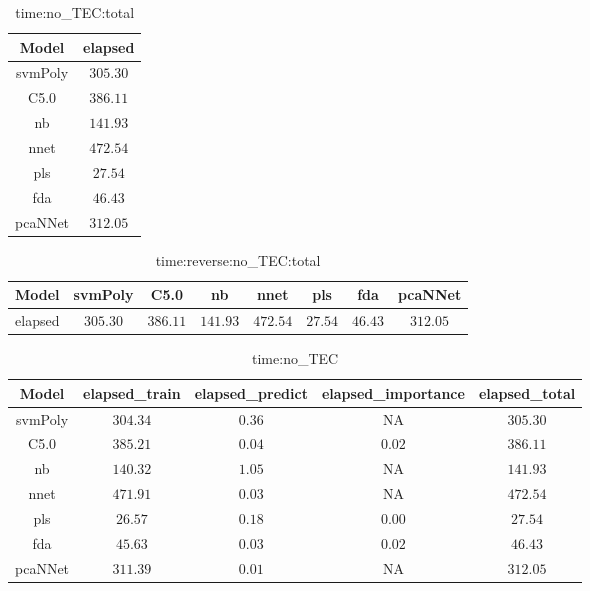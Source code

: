 \begin{table}[!ht]
	\centering
	\begin{tabular}{|c|c|}
		\hline
		Model & elapsed \\ \hline
		svmPoly & $305.30$ \\ \hline
		C5.0 & $386.11$ \\ \hline
		nb & $141.93$ \\ \hline
		nnet & $472.54$ \\ \hline
		pls & $27.54$ \\ \hline
		fda & $46.43$ \\ \hline
		pcaNNet & $312.05$ \\ \hline
	\end{tabular}
	\caption{time:no_TEC:total}
	\label{tab:time:no_TEC:total}
\end{table}

\begin{table}[!ht]
	\centering
	\begin{tabular}{|c|c|c|c|c|c|c|c|}
		\hline
		Model & svmPoly & C5.0 & nb & nnet & pls & fda & pcaNNet \\ \hline
		elapsed & $305.30$ & $386.11$ & $141.93$ & $472.54$ & $27.54$ & $46.43$ & $312.05$ \\ \hline
	\end{tabular}
	\caption{time:reverse:no_TEC:total}
	\label{tab:time:reverse:no_TEC:total}
\end{table}

\begin{table}[!ht]
	\centering
	\begin{tabular}{|c|c|c|c|c|}
		\hline
		Model & elapsed_train & elapsed_predict & elapsed_importance & elapsed_total \\ \hline
		svmPoly & $304.34$ & $0.36$ & NA & $305.30$ \\ \hline
		C5.0 & $385.21$ & $0.04$ & $0.02$ & $386.11$ \\ \hline
		nb & $140.32$ & $1.05$ & NA & $141.93$ \\ \hline
		nnet & $471.91$ & $0.03$ & NA & $472.54$ \\ \hline
		pls & $26.57$ & $0.18$ & $0.00$ & $27.54$ \\ \hline
		fda & $45.63$ & $0.03$ & $0.02$ & $46.43$ \\ \hline
		pcaNNet & $311.39$ & $0.01$ & NA & $312.05$ \\ \hline
	\end{tabular}
	\caption{time:no_TEC}
	\label{tab:time:no_TEC}
\end{table}

